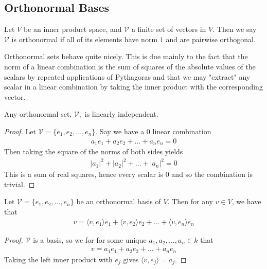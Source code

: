 \documentclass[]{article}
\begin{document}
\subsection{Orthonormal Bases}

\begin{defi} 
		Let $V$ be an inner product space, and $\mathcal{V}$ a finite set of vectors in $V$. Then we say $\mathcal{V}$ is orthonormal if all of its elements have norm $1$ and are pairwise orthogonal.
\end{defi}

Orthonormal sets behave quite nicely. This is due mainly to the fact that the norm of a linear combination is the sum of squares of the absolute values of the scalars by repeated applications of Pythagoras and that we may "extract" any scalar in a linear combination by taking the inner product with the corresponding vector.

\begin{thm}
		Any orthonormal set, $\mathcal{V},$ is linearly independent.
\end{thm}

\begin{proof}
		Let $\mathcal{V} = \{e_1, e_2, \ldots, e_n\}$. Say we have a $0$ linear combination 
		\begin{align*}
			a_1 e_1 + a_2 e_2 + \ldots + a_n e_n = 0	
		\end{align*}
		Then taking the square of the norms of both sides yields
		\begin{align*}
				|a_1|^2 + |a_2|^2 + \ldots + |a_n|^2 = 0
		\end{align*}
		This is a sum of real squares, hence every scalar is $0$ and so the combination is trivial.
\end{proof}

\begin{thm}
		Let $\mathcal{V} = \{e_1, e_2, \ldots, e_n\}$ be an orthonormal basis of $V$. Then for any $v \in V$, we have that 
		\begin{align*}
				v = \langle v, e_1 \rangle e_1 + \langle v, e_2 \rangle e_2 + \ldots + \langle v, e_n \rangle e_n
		\end{align*}
\end{thm}

\begin{proof}
		$\mathcal{V}$ is a basis, so we for for some unique $a_1, a_2, \ldots, a_n \in k$ that
		\begin{align*}
				v = a_1 e_1 + a_2 e_2 + \ldots + a_n e_n
		\end{align*}
		Taking the left inner product with $e_j$ gives $\langle v, e_j \rangle = a_j$. 
\end{proof}
\end{document}
